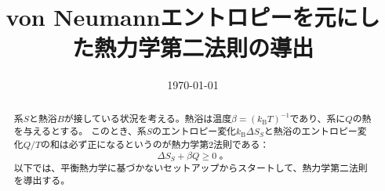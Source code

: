 
\title{von Neumannエントロピーを元にした熱力学第二法則の導出}
\date{\today}

\maketitle
\begin{abstract}
	系$S$と熱浴$B$が接している状況を考える。熱浴は温度$\beta = (k_{\text{B}}T)^{-1}$であり、系に$Q$の熱を与えるとする。
	このとき、系$S$のエントロピー変化$k_{\text{B}}\varDelta S_S$と熱浴のエントロピー変化$Q/T$の和は必ず正になるというのが熱力学第2法則である：
	\begin{equation*}
		\varDelta S_S + \beta Q \geq 0\;。
	\end{equation*}
	以下では、平衡熱力学に基づかないセットアップからスタートして、熱力学第二法則を導出する。
\end{abstract}
\tableofcontents
